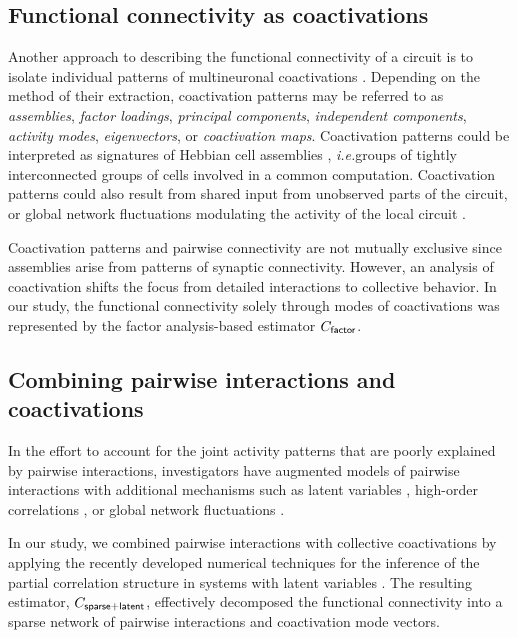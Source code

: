 \subsection*{Functional connectivity as coactivations}
Another approach to describing the functional connectivity of a circuit is to isolate individual patterns of multineuronal coactivations \cite{Gerstein:1989, Chapin:1999, Peyrache:2010, Ch:2010, Lopes:2011, Lopes:2013}. Depending on the method of their extraction, coactivation patterns may be referred to as \emph{assemblies}, \emph{factor loadings}, \emph{principal components}, \emph{independent components}, \emph{activity modes}, \emph{eigenvectors}, or \emph{coactivation maps}. Coactivation patterns could be interpreted as signatures of Hebbian cell assemblies \cite{Gerstein:1989, Ch:2010}, \emph{i.e.}\;groups of tightly interconnected groups of cells involved in a common computation.  Coactivation patterns could also result from shared input from unobserved parts of the circuit, or global network fluctuations modulating the activity of the local circuit \cite{Okun:2012}.

Coactivation patterns and pairwise connectivity are not mutually exclusive since assemblies arise from patterns of synaptic connectivity.  However, an analysis of coactivation shifts the focus from detailed interactions to  collective behavior.
In our study, the functional connectivity solely through modes of coactivations was represented by the factor analysis-based estimator $C_{\sf factor}$.

\subsection*{Combining pairwise interactions and coactivations}
In the effort to account for the joint activity patterns that are poorly explained by pairwise interactions, investigators have augmented models of pairwise interactions with additional mechanisms such as latent variables \cite{Koster:2013},  high-order correlations \cite{Ganmor:2011}, or global network fluctuations \cite{Tkacik:2013}.

In our study, we combined pairwise interactions with collective coactivations by applying the recently developed numerical techniques for the inference of the partial correlation structure in systems with latent variables \cite{Chandrasekaran:2010, Ma:2013}.  The resulting estimator, $C_{\sf sparse+latent}$, effectively decomposed the functional connectivity into a sparse network of pairwise interactions and coactivation mode vectors.

